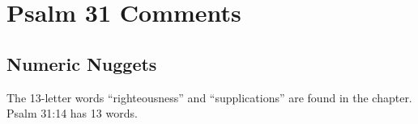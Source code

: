 \section{Psalm 31 Comments}

\subsection{Numeric Nuggets}
The 13-letter words ``righteousness'' and ``supplications'' are found in the chapter. Psalm 31:14 has 13 words.